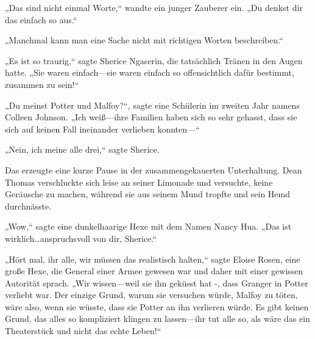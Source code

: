 „Das sind nicht einmal Worte,“ wandte ein junger Zauberer ein. „Du denkst dir das einfach so aus.“

„Manchmal kann man eine Sache nicht mit richtigen Worten beschreiben.“

„Es ist so traurig,“ sagte Sherice Ngaserin, die tatsächlich Tränen in den Augen hatte. „Sie waren einfach—sie waren einfach so offensichtlich dafür bestimmt, zusammen zu sein!“

„Du meinst Potter und Malfoy?“, sagte eine Schülerin im zweiten Jahr namens Colleen Johnson. „Ich weiß—ihre Familien haben sich so sehr gehasst, dass sie sich auf keinen Fall ineinander verlieben konnten—“

„Nein, ich meine alle drei,“ sagte Sherice.

Das erzeugte eine kurze Pause in der zusammengekauerten Unterhaltung. Dean Thomas verschluckte sich leise an seiner Limonade und versuchte, keine Geräusche zu machen, während sie aus seinem Mund tropfte und sein Hemd durchnässte.

„Wow,“ sagte eine dunkelhaarige Hexe mit dem Namen Nancy Hua. „Das ist wirklich…anspruchsvoll von dir, Sherice.“

„Hört mal, ihr alle, wir müssen das realistisch halten,“ sagte Eloise Rosen, eine große Hexe, die General einer Armee gewesen war und daher mit einer gewissen Autorität sprach. „Wir wissen—weil sie ihn geküsst hat -, dass Granger in Potter verliebt war. Der einzige Grund, warum sie versuchen würde, Malfoy zu töten, wäre also, wenn sie wüsste, dass sie Potter an ihn verlieren würde. Es gibt keinen Grund, das alles so kompliziert klingen zu lassen—ihr tut alle so, als wäre das ein Theaterstück und nicht das echte Leben!“

